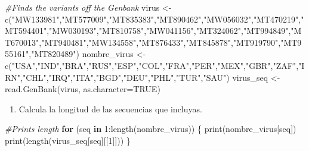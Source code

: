 \documentclass[
]{article}
\newenvironment{Shaded}{\begin{snugshade}}{\end{snugshade}}
\newcommand{\AttributeTok}[1]{\textcolor[rgb]{0.77,0.63,0.00}{#1}}
\newcommand{\CommentTok}[1]{\textcolor[rgb]{0.56,0.35,0.01}{\textit{#1}}}
\newcommand{\ConstantTok}[1]{\textcolor[rgb]{0.00,0.00,0.00}{#1}}
\newcommand{\ControlFlowTok}[1]{\textcolor[rgb]{0.13,0.29,0.53}{\textbf{#1}}}
\newcommand{\DecValTok}[1]{\textcolor[rgb]{0.00,0.00,0.81}{#1}}
\newcommand{\FunctionTok}[1]{\textcolor[rgb]{0.00,0.00,0.00}{#1}}
\newcommand{\NormalTok}[1]{#1}
\newcommand{\OtherTok}[1]{\textcolor[rgb]{0.56,0.35,0.01}{#1}}
\newcommand{\SpecialCharTok}[1]{\textcolor[rgb]{0.00,0.00,0.00}{#1}}
\newcommand{\StringTok}[1]{\textcolor[rgb]{0.31,0.60,0.02}{#1}}
\providecommand{\tightlist}{%
  \setlength{\itemsep}{0pt}\setlength{\parskip}{0pt}}
\begin{document}
\begin{Shaded}
\begin{Highlighting}[]
\CommentTok{\#Finds the variants off the Genbank}
\NormalTok{virus }\OtherTok{\textless{}{-}} \FunctionTok{c}\NormalTok{(}\StringTok{"MW133981"}\NormalTok{,}\StringTok{"MT577009"}\NormalTok{,}\StringTok{"MT835383"}\NormalTok{,}\StringTok{"MT890462"}\NormalTok{,}\StringTok{"MW056032"}\NormalTok{,}\StringTok{"MT470219"}\NormalTok{,}\StringTok{"MT594401"}\NormalTok{,}\StringTok{"MW030193"}\NormalTok{,}\StringTok{"MT810758"}\NormalTok{,}\StringTok{"MW041156"}\NormalTok{,}\StringTok{"MT324062"}\NormalTok{,}\StringTok{"MT994849"}\NormalTok{,}\StringTok{"MT670013"}\NormalTok{,}\StringTok{"MT940481"}\NormalTok{,}\StringTok{"MW134558"}\NormalTok{,}\StringTok{"MT876433"}\NormalTok{,}\StringTok{"MT845878"}\NormalTok{,}\StringTok{"MT919790"}\NormalTok{,}\StringTok{"MT955161"}\NormalTok{,}\StringTok{"MT820489"}\NormalTok{)}
\NormalTok{nombre\_virus }\OtherTok{\textless{}{-}} \FunctionTok{c}\NormalTok{(}\StringTok{"USA"}\NormalTok{,}\StringTok{"IND"}\NormalTok{,}\StringTok{"BRA"}\NormalTok{,}\StringTok{"RUS"}\NormalTok{,}\StringTok{"ESP"}\NormalTok{,}\StringTok{"COL"}\NormalTok{,}\StringTok{"FRA"}\NormalTok{,}\StringTok{"PER"}\NormalTok{,}\StringTok{"MEX"}\NormalTok{,}\StringTok{"GBR"}\NormalTok{,}\StringTok{"ZAF"}\NormalTok{,}\StringTok{"IRN"}\NormalTok{,}\StringTok{"CHL"}\NormalTok{,}\StringTok{"IRQ"}\NormalTok{,}\StringTok{"ITA"}\NormalTok{,}\StringTok{"BGD"}\NormalTok{,}\StringTok{"DEU"}\NormalTok{,}\StringTok{"PHL"}\NormalTok{,}\StringTok{"TUR"}\NormalTok{,}\StringTok{"SAU"}\NormalTok{)}
\NormalTok{virus\_seq }\OtherTok{\textless{}{-}} \FunctionTok{read.GenBank}\NormalTok{(virus, }\AttributeTok{as.character=}\ConstantTok{TRUE}\NormalTok{)}
\end{Highlighting}
\end{Shaded}

\begin{enumerate}
\def\labelenumi{\arabic{enumi}.}
\setcounter{enumi}{1}
\tightlist
\item
  Calcula la longitud de las secuencias que incluyas.
\end{enumerate}

\begin{Shaded}
\begin{Highlighting}[]
\CommentTok{\#Prints length}
\ControlFlowTok{for}\NormalTok{ (seq }\ControlFlowTok{in} \DecValTok{1}\SpecialCharTok{:}\FunctionTok{length}\NormalTok{(nombre\_virus)) \{}
  \FunctionTok{print}\NormalTok{(nombre\_virus[seq])}
  \FunctionTok{print}\NormalTok{(}\FunctionTok{length}\NormalTok{(virus\_seq[seq][[}\DecValTok{1}\NormalTok{]]))}
\NormalTok{\}}
\end{Highlighting}
\end{Shaded}
\end{document}
